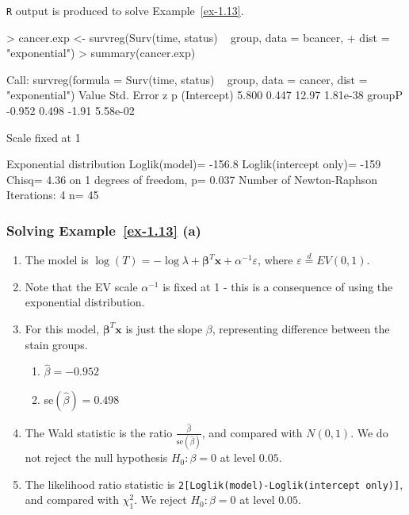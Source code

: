 \documentclass{beamer}
\newcommand{\boldbeta}{{\boldsymbol \beta}}
\begin{document}
\begin{frame}[fragile] \frametitle{}
\texttt{R} output is produced to solve Example~\ref{ex-1.13}.
\begin{scriptsize}
\begin{Schunk}
\begin{Sinput}
> cancer.exp <- survreg(Surv(time, status) ~ group, data = bcancer, 
+     dist = "exponential")
> summary(cancer.exp)
\end{Sinput}
\begin{Soutput}
Call:
survreg(formula = Surv(time, status) ~ group, data = cancer, 
    dist = "exponential")
             Value Std. Error     z        p
(Intercept)  5.800      0.447 12.97 1.81e-38
groupP      -0.952      0.498 -1.91 5.58e-02

Scale fixed at 1 

Exponential distribution
Loglik(model)= -156.8   Loglik(intercept only)= -159
	Chisq= 4.36 on 1 degrees of freedom, p= 0.037 
Number of Newton-Raphson Iterations: 4 
n= 45 
\end{Soutput}
\end{Schunk}
\end{scriptsize}
\end{frame}

\begin{frame}[fragile] \frametitle{Solving Example~\ref{ex-1.13} (a)}

\begin{enumerate}

\item The model is $\log (T) = -\log\lambda + \boldbeta^T\mathbf{x} +
  \alpha^{-1} \varepsilon$, where $\varepsilon \stackrel{d}{=} EV(0,1)$.

\item Note that the EV scale $\alpha^{-1}$ is fixed at 1 - this
  is a consequence of using the exponential distribution.

\item For this model, $\boldbeta^T\mathbf{x}$ is just the slope $\beta$, representing
  difference between the stain groups.
\begin{enumerate}
\item $\hat{\beta} = -0.952$
\item se$(\hat{\beta}) = 0.498$
\end{enumerate}
\item The Wald statistic is the ratio $\frac{\hat{\beta}}{\mbox{se}(\hat{\beta})}$, 
and compared with $N(0,1)$.  We do not reject the null hypothesis $H_0: \beta=0$ at level $0.05$.
\item The likelihood ratio statistic is \texttt{2[Loglik(model)-Loglik(intercept only)]}, \\
and compared with $\chi^2_1$.  
We reject $H_0: \beta=0$ at level $0.05$.
\end{enumerate}
\end{frame}
\end{document}
